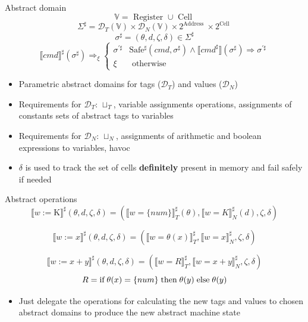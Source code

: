 \documentclass[aspectratio=169]{beamer}
\begin{document}
\begin{frame}{Abstract domain}
  $$\mathbb{V}=\text { Register } \cup \text { Cell } $$
  $$ \Sigma^{\sharp} = \mathcal{D}_T ( \mathbb{V} ) \times \mathcal{D}_N (\mathbb{V}) \times 2^{\text {Address }} \times 2^{\text {Cell }}$$
  $$\sigma^{\sharp}=(\theta, d, \zeta, \delta) \in \Sigma^{\sharp} $$
  $$ \llbracket c m d \rrbracket^{\sharp}(\sigma^{\sharp}) \Rightarrow_{\xi} \begin{cases}\sigma^{\prime \sharp} & \mathrm{Safe^{\sharp}}(c m d, \sigma^{\sharp}) \wedge\llbracket c m d^{\sharp} \rrbracket (\sigma^{\sharp}) \Rightarrow \sigma^{\prime \sharp} \\ \xi & \text { otherwise }\end{cases} $$

  \begin{itemize}
    \item Parametric abstract domains for tags ($\mathcal{D}_T$) and values ($\mathcal{D}_N$)
    \item Requirements for $\mathcal{D}_T$: $\sqcup_T$, variable assignments operations, assignments of constants sets of abstract
          tags to variables
    \item Requirements for $\mathcal{D}_N$: $\sqcup_N$, assignments of arithmetic and boolean expressions to variables, havoc
    \item $\delta$ is used to track the set of cells \textbf{definitely} present in memory and fail safely if needed
  \end{itemize}
\end{frame}

\begin{frame}{Abstract operations}
  $$
    \llbracket w := \mathrm{K} \rrbracket^{\sharp}(\theta, d, \zeta, \delta)= (\llbracket w= \{num\} \rrbracket_{T}^{\sharp}(\theta),\llbracket w=K \rrbracket_{N}^{\sharp}(d),\zeta,\delta)
  $$

  $$
    \llbracket w := x \rrbracket^{\sharp}(\theta, d, \zeta, \delta)= (\llbracket w= \theta(x) \rrbracket_{T}^{\sharp},\llbracket w=x \rrbracket_{N}^{\sharp},\zeta,\delta)
  $$

  $$
    \llbracket w := x + y \rrbracket^{\sharp}(\theta, d, \zeta, \delta) = (\llbracket w=R \rrbracket^{\sharp}_{T},\llbracket w=x+y \rrbracket_{N}^{\sharp},\zeta,\delta)
  $$
  $$ R= \text{if} \thickspace \theta(x) = { \{num \}} \thickspace \text{then} \thickspace \theta(y) \thickspace \text{else} \thickspace \theta(y)$$

  \begin{itemize}
    \item Just delegate the operations for calculating the new tags and values to
    chosen abstract domains to produce the new abstract machine state
  \end{itemize}
\end{frame}
\end{document}

